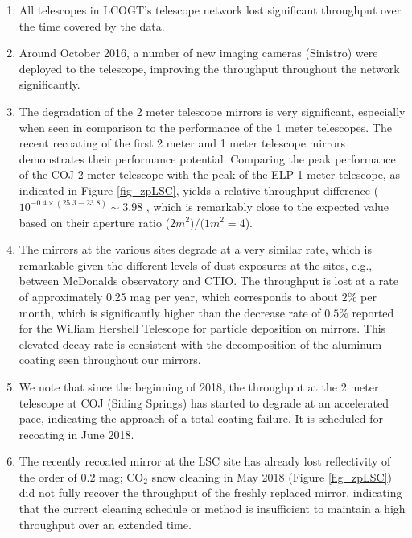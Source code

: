\documentclass[]{spieman}
\begin{document}
\begin{enumerate}
\item All telescopes in LCOGT's telescope network lost significant throughput over the time covered
 by the data. 

\item Around October 2016, a number of new imaging cameras (Sinistro) were deployed to the 
telescope, improving the throughput throughout the network significantly.

\item The degradation of the 2 meter telescope mirrors is very significant, especially when seen in
comparison to the performance of the 1 meter telescopes. The recent recoating of the first 2 meter
and 1 meter telescope mirrors demonstrates their  performance potential. Comparing the peak 
performance of the COJ 2 meter telescope with the peak of the ELP 1 meter telescope, as indicated 
in Figure \ref{fig_zpLSC}, yields a  relative throughput difference  ($10^{-0.4\times (25.3-23.8)} 
\sim 3.98$ , which is remarkably close to the expected value based on their aperture ratio 
($2m^2)/(1m^2 = 4$).

\item The mirrors at the various sites degrade at a very similar rate, which is remarkable given the
different levels of dust exposures at the sites, e.g., between McDonalds observatory and CTIO. The
throughput is lost at a rate of approximately 0.25 mag per year, which corresponds to about $2 \%$
per month, which is significantly higher than the decrease rate of $0.5\%$ reported for the William
Hershell Telescope\cite{designolt,benn2000} for particle deposition on mirrors. This elevated decay
rate is  consistent with the decomposition of the aluminum coating seen throughout our mirrors.

\item We note that since the beginning of 2018, the throughput at the 2 meter telescope at COJ 
(Siding Springs) has started to degrade at an accelerated pace, indicating the approach of a total 
coating failure. It is scheduled for recoating in June 2018.

\item The recently recoated mirror at the LSC site has already lost reflectivity of the order of 0.2
mag; CO$_2$ snow cleaning in May 2018 (Figure \ref{fig_zpLSC}) did not fully recover the throughput 
of the freshly replaced mirror,  indicating that the current cleaning schedule or method is 
insufficient to maintain a high throughput over an extended time.

\end{enumerate}
\end{document}
